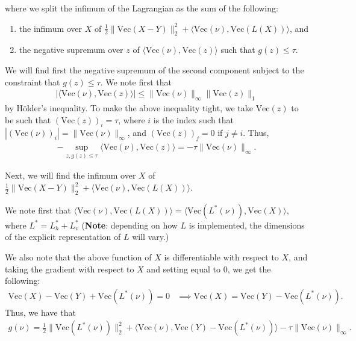 \documentclass{article}
\newcommand{\+}[1]{\ensuremath{\boldsymbol{\rm #1}}}
\newcommand{\abs}[1]{\left| #1 \right|}
\newcommand{\norm}[1]{\lVert  #1 \rVert}
\newcommand{\parens}[1]{\left( #1 \right)}
\newcommand{\angles}[1]{\langle #1 \rangle}
\begin{document}
\begin{enumerate}
		where we split the infimum of the Lagrangian as the sum of the following:
		\begin{enumerate}
			\item the infimum over $X$ of $\frac{1}{2} \norm{\text{Vec} \parens{X - Y}}_{2}^{2} + \angles{\text{Vec} \parens{\nu}, \text{Vec} \parens{ L \parens{X}}}$, and
			\item the negative supremum over $z$ of $\angles{ \text{Vec} \parens{\nu}, \text{Vec} \parens{z}}$ such that $g \parens{z} \leq \tau$.
		\end{enumerate}
	
		We will find first the negative supremum of the second component subject to the constraint that $g \parens{z} \leq \tau$.
		We note first that 
		\begin{align*}
			\abs{\angles{ \text{Vec} \parens{\nu}, \text{Vec} \parens{z}}} \leq \norm{\text{Vec} \parens{\nu}}_{\infty} \norm{\text{Vec} \parens{z}}_{1} 
		\end{align*}
		by H\"{o}lder's inequality.
		To make the above inequality tight, we take $\text{Vec} \parens{z}$ to be such that $\parens{\text{Vec} \parens{z}}_{i} = \tau$, where $i$ is the index such that $\abs{\parens{\text{Vec} \parens{\nu}}_{i}} = \norm{\text{Vec} \parens{\nu}}_{\infty}$, and $\parens{\text{Vec} \parens{z}}_{j} = 0$ if $j \neq i$.
		Thus,
		\begin{align*}
			-\sup_{z, g \parens{z} \leq \tau} \angles{\text{Vec} \parens{\nu}, \text{Vec} \parens{z}} = - \tau \norm{\text{Vec} \parens{\nu}}_{\infty}.
		\end{align*}
	
		Next, we will find the infimum over $X$ of  $\frac{1}{2} \norm{\text{Vec} \parens{X - Y}}_{2}^{2} + \angles{\text{Vec} \parens{\nu}, \text{Vec} \parens{ L \parens{X}}}$.
		
		We note first that $\angles{\text{Vec} \parens{\nu}, \text{Vec} \parens{L \parens{X}}} = \angles{\text{Vec} \parens{L^{*} \parens{\nu}}, \text{Vec} \parens{X}}$, where $L^{*} = L_{h}^{*} + L_{v}^{*}$ (\textbf{Note}: depending on how $L$ is implemented, the dimensions of the explicit representation of $L$ will vary.)
		
		We also note that the above function of $X$ is differentiable with respect to $X$, and taking the gradient with respect to $X$ and setting equal to $0$, we get the following:
		\begin{align*}
			\text{Vec} \parens{X} - \text{Vec} \parens{Y} + \text{Vec} \parens{L^{*} \parens{\nu}} = 0 & \implies \text{Vec} \parens{X} = \text{Vec} \parens{Y} - \text{Vec} \parens{L^{*} \parens{ \nu}}.
		\end{align*} 
		Thus, we have that 
		\begin{align*}
			g \parens{ \nu} = \frac{1}{2} \norm{\text{Vec} \parens{ L^{*} \parens{\nu}}}_{2}^{2} + \angles{\text{Vec} \parens{\nu}, \text{Vec} \parens{Y} - \text{Vec} \parens{L^{*} \parens{ \nu}}} - \tau \norm{\text{Vec} \parens{\nu}}_{\infty}.
		\end{align*}
		
	\end{enumerate}
	
\end{document}
